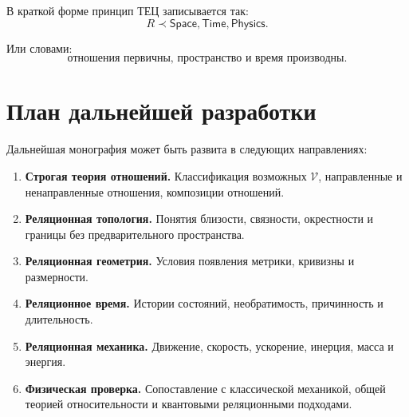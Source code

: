 \documentclass[12pt,a4paper,oneside]{book}
\theoremstyle{definition}
\theoremstyle{plain}
\theoremstyle{remark}
\newcommand{\Rel}{R}
\newcommand{\Values}{\mathcal V}
\newcommand{\Space}{\mathsf{Space}}
\newcommand{\Time}{\mathsf{Time}}
\newcommand{\Physics}{\mathsf{Physics}}
\begin{document}
В краткой форме принцип ТЕЦ записывается так:
\[
\boxed{\Rel \prec \Space,\Time,\Physics.}
\]

Или словами:
\[
\boxed{\text{отношения первичны, пространство и время производны.}}
\]

\backmatter

\chapter*{План дальнейшей разработки}

Дальнейшая монография может быть развита в следующих направлениях:

\begin{enumerate}[label=\textbf{Часть \Roman*.}, leftmargin=2cm]
    \item \textbf{Строгая теория отношений.} Классификация возможных \(\Values\), направленные и ненаправленные отношения, композиции отношений.
    \item \textbf{Реляционная топология.} Понятия близости, связности, окрестности и границы без предварительного пространства.
    \item \textbf{Реляционная геометрия.} Условия появления метрики, кривизны и размерности.
    \item \textbf{Реляционное время.} Истории состояний, необратимость, причинность и длительность.
    \item \textbf{Реляционная механика.} Движение, скорость, ускорение, инерция, масса и энергия.
    \item \textbf{Физическая проверка.} Сопоставление с классической механикой, общей теорией относительности и квантовыми реляционными подходами.
\end{enumerate}
\end{document}
